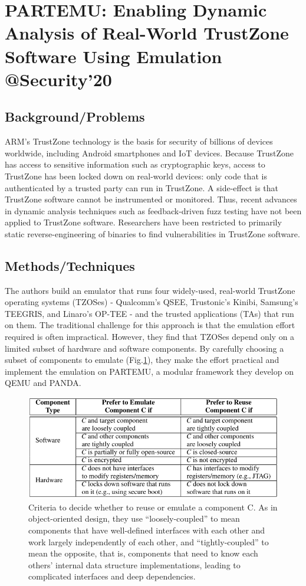\section{PARTEMU: Enabling Dynamic Analysis of Real-World TrustZone Software Using Emulation @Security'20}
\subsection{Background/Problems}
ARM’s TrustZone technology is the basis for security of billions of devices worldwide, including Android smartphones and IoT devices. Because TrustZone has access to sensitive information such as cryptographic keys, access to TrustZone has been locked down on real-world devices: only code that is authenticated by a trusted party can run in TrustZone. A side-effect is that TrustZone software cannot be instrumented or monitored. Thus, recent advances in dynamic analysis techniques such as feedback-driven fuzz testing have not been applied to TrustZone software. Researchers have been restricted to primarily static reverse-engineering of binaries to find vulnerabilities in TrustZone software.
\subsection{Methods/Techniques}
The authors build an emulator that runs four widely-used, real-world TrustZone operating systems (TZOSes) - Qualcomm’s QSEE, Trustonic’s Kinibi, Samsung’s TEEGRIS, and Linaro’s OP-TEE - and the trusted applications (TAs) that run on them. The traditional challenge for this approach is that the emulation effort required is often impractical. However, they find that TZOSes depend only on a limited subset of hardware and software components. By carefully choosing a subset of components to emulate (Fig.\ref{fig:partemu}), they make the effort practical and implement the emulation on PARTEMU, a modular framework they develop on QEMU and PANDA.
\begin{figure}[h]
    \centering
    \includegraphics[width=.9\linewidth]{partemu.png} %
    \caption{Criteria to decide whether to reuse or emulate a component C. As in object-oriented design, they use “loosely-coupled” to mean components that have well-defined interfaces with each other and work largely independently of each other, and “tightly-coupled” to mean the opposite, that is, components that need to know each others’ internal data structure implementations, leading to complicated interfaces and deep dependencies.}	
    \label{fig:partemu}
\end{figure}
